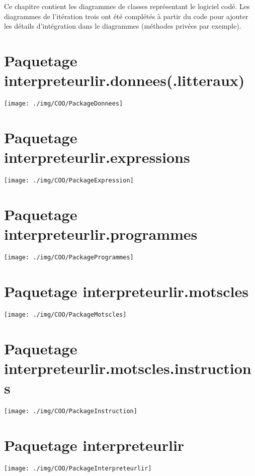 \par Ce chapitre contient les diagrammes de classes représentant le logiciel codé. Les diagrammes de l'itération trois ont été complétés à partir du code pour ajouter les détails d'intégration dans le diagrammes (méthodes privées par exemple).

\section{Paquetage interpreteurlir.donnees(.litteraux)}
\texttt{[image: ./img/COO/PackageDonnees]}

\section{Paquetage interpreteurlir.expressions}
\texttt{[image: ./img/COO/PackageExpression]}

\section{Paquetage interpreteurlir.programmes}
\texttt{[image: ./img/COO/PackageProgrammes]}

\section{Paquetage interpreteurlir.motscles}
\texttt{[image: ./img/COO/PackageMotscles]}

\section{Paquetage interpreteurlir.motscles.instructions}
\texttt{[image: ./img/COO/PackageInstruction]}

\section{Paquetage interpreteurlir}
\texttt{[image: ./img/COO/PackageInterpreteurlir]}